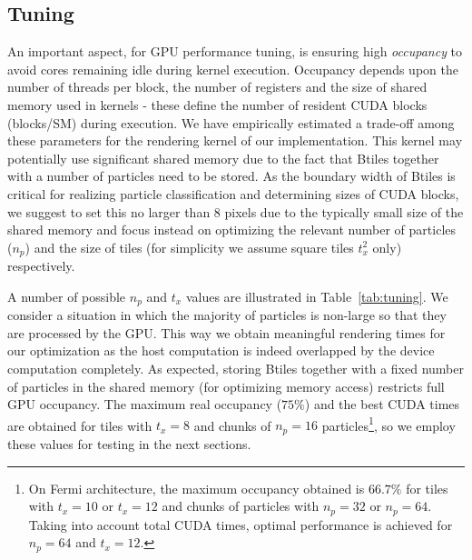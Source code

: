 \documentclass[preprint,5pt]{elsarticle}
\begin{document}
\subsection{Tuning}
\label{sec:gpuperf}
An important aspect, for GPU performance tuning, is ensuring high {\it occupancy} to avoid cores remaining idle during kernel execution. Occupancy depends upon the number of threads per block, the number of registers and the size of shared memory used in kernels - these define the number of resident CUDA blocks (blocks/SM) during execution. We have empirically estimated a trade-off among these parameters for the rendering kernel of our implementation. This kernel may potentially use significant shared memory due to the fact that Btiles together with a number of particles need to be stored. As the boundary width of Btiles is critical for realizing particle classification and determining sizes of CUDA blocks, we suggest to set this no larger than 8 pixels due to the typically small size of the shared memory and focus instead on optimizing the relevant number of particles ($n_p$) and the size of tiles (for simplicity we assume square tiles $t_x^2$ only) respectively.

A number of possible $n_p$ and $t_x$ values are illustrated in Table~\ref{tab:tuning}. We consider a situation in which the majority of particles is non-large so that they are processed by the GPU. This way we obtain meaningful rendering times for our optimization as the host computation is indeed overlapped by the device computation completely. As expected, storing Btiles together with a fixed number of particles in the shared memory (for optimizing memory access) restricts full GPU occupancy. The maximum real occupancy ($75\%$) and the best CUDA times are obtained for tiles with $t_x = 8$ and chunks of  $n_p = 16$ particles\footnote{On Fermi architecture, the maximum occupancy obtained is $66.7\%$ for tiles with $t_x = 10$ or $t_x = 12$ and chunks of particles with $n_p = 32$ or $n_p=64$. Taking into account total CUDA times, optimal performance is achieved for $n_p=64$ and $t_x = 12$.}, so we employ these values for testing in the next sections.
\end{document}
